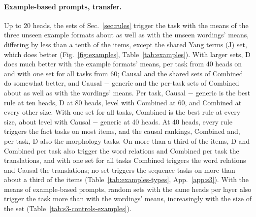 \documentclass[10pt,a4paper]{article}
\begin{document}
\begin{table}[tbp]
\centering\small

\caption{Accuracy of every rule re-identified on Yang et al.'s five templates and the 15 identification wordings, with the means of the 15 test wordings (Fig.~\ref{fig:wordings-reid}); the best rule of each row in bold. --: the rule does not fill the size on every task.}
\label{tab:wordings-reid}
\end{table}

\paragraph{Example-based prompts, transfer.} Up to 20 heads, the sets of Sec.~\ref{sec:rules} trigger the task with the means of the three unseen example formats about as well as with the unseen wordings' means, differing by less than a tenth of the items, except the shared Yang terms (J) set, which does better (Fig.~\ref{fig:examples}, Table~\ref{tab:examples}). With larger sets, D does much better with the example formats' means, per task from 40 heads on and with one set for all tasks from 60; Causal and the shared sets of Combined do somewhat better, and Causal $-$ generic and the per-task sets of Combined about as well as with the wordings' means. Per task, Causal $-$ generic is the best rule at ten heads, D at 80 heads, level with Combined at 60, and Combined at every other size. With one set for all tasks, Combined is the best rule at every size, about level with Causal $-$ generic at 40 heads. At 40 heads, every rule triggers the fact tasks on most items, and the causal rankings, Combined and, per task, D also the morphology tasks. On more than a third of the items, D and Combined per task also trigger the word relations and Combined per task the translations, and with one set for all tasks Combined triggers the word relations and Causal the translations; no set triggers the sequence tasks on more than about a third of the items (Table~\ref{tab:examples-types}, App.~\ref{app:s3}). With the means of example-based prompts, random sets with the same heads per layer also trigger the task more than with the wordings' means, increasingly with the size of the set (Table~\ref{tab:s3-controls-examples}).
\end{document}
